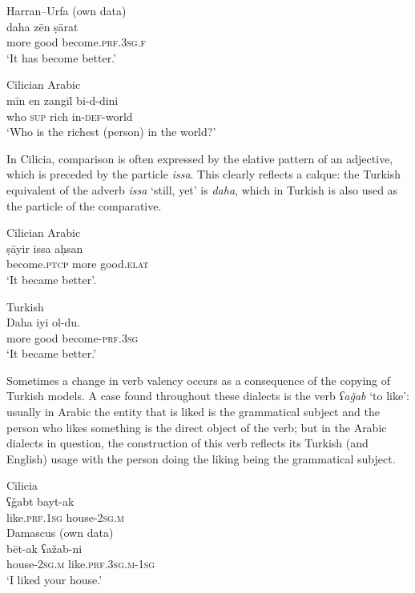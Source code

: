 \documentclass[output=paper]{langsci/langscibook}
\begin{document}
\ea\label{ex:prochazka:} 
{Harran--Urfa (own data)}\\
\gll daha zēn ṣārat\\
     more good become.\textsc{prf.3sg.f}\\
\glt ‘It has become better.’
\z

\ea\label{ex:prochazka:} 
{Cilician Arabic \citep[155]{Procházka2002Cukurova}} \\
\gll mīn en zangīl bi-d-dini\\
     who \textsc{sup} rich in-\textsc{def}-world\\
\glt ‘Who is the richest (person) in the world?’ 
\z

In Cilicia, comparison is often expressed by the elative pattern of an adjective, which is preceded by the particle \textit{issa}. This clearly reflects a calque: the Turkish equivalent of the adverb \textit{issa} ‘still, yet’ is \textit{daha}, which in Turkish is also used as the particle of the comparative. 

\ea\label{ex:prochazka:} 
{Cilician Arabic \citep[202]{Procházka2002Cukurova}} \\
\gll ṣāyir issa aḥsan \\
     become.\textsc{ptcp} more good.\textsc{elat}\\
\glt ‘It became better’. 
\z

\ea\label{ex:prochazka:} 
{Turkish}\\
\gll Daha iyi ol-du.\\
     more good become-\textsc{prf.3sg}\\
\glt ‘It became better.’
\z

Sometimes a change in verb valency occurs as a consequence of the copying of Turkish models. A case found throughout these dialects is the verb \textit{ʕaǧab} ‘to like’: usually in Arabic the entity that is liked is the grammatical subject and the person who likes something is the direct object of the verb; but in the Arabic dialects in question, the construction of this verb reflects its Turkish (and English) usage with the person doing the liking being the grammatical subject.

\ea\label{ex:prochazka:} 
\ea Cilicia \citep[200]{Procházka2002Cukurova}\\
   \gll ʕǧabt bayt-ak\\
     like.\textsc{prf.1sg} house-\textsc{2sg.m}\\
\ex
 Damascus (own data)\\
   \gll bēt-ak ʕažab-ni\\
     house-\textsc{2sg.m} like.\textsc{prf.3sg.m-1sg}\\
\glt ‘I liked your house.’
\z
\z
\end{document}
